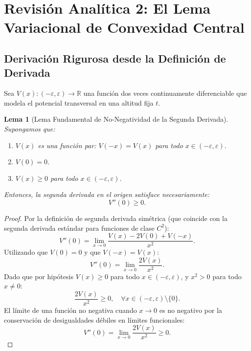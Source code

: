 \documentclass[11pt,a4paper]{article}
\newtheorem{lemma}[theorem]{Lema}
\theoremstyle{definition}
\theoremstyle{remark}
\begin{document}
\section{Revisión Analítica 2: El Lema Variacional de Convexidad Central}

\subsection{Derivación Rigurosa desde la Definición de Derivada}

Sea $V(x) \colon (-\varepsilon, \varepsilon) \to \mathbb{R}$ una función dos veces continuamente diferenciable que modela el potencial transversal en una altitud fija $t$.

\begin{lemma}[Lema Fundamental de No-Negatividad de la Segunda Derivada]
Supongamos que:
\begin{enumerate}
    \item $V(x)$ es una función par: $V(-x) = V(x)$ para todo $x \in (-\varepsilon, \varepsilon)$.
    \item $V(0) = 0$.
    \item $V(x) \ge 0$ para todo $x \in (-\varepsilon, \varepsilon)$.
\end{enumerate}
Entonces, la segunda derivada en el origen satisface necesariamente:
\begin{equation}
V''(0) \ge 0.
\end{equation}
\end{lemma}

\begin{proof}
Por la definición de segunda derivada simétrica (que coincide con la segunda derivada estándar para funciones de clase $C^2$):
\begin{equation}
V''(0) = \lim_{x \to 0} \frac{V(x) - 2V(0) + V(-x)}{x^2}.
\end{equation}
Utilizando que $V(0) = 0$ y que $V(-x) = V(x)$:
\begin{equation}
V''(0) = \lim_{x \to 0} \frac{2V(x)}{x^2}.
\end{equation}
Dado que por hipótesis $V(x) \ge 0$ para todo $x \in (-\varepsilon, \varepsilon)$, y $x^2 > 0$ para todo $x \neq 0$:
\begin{equation}
\frac{2V(x)}{x^2} \ge 0, \quad \forall x \in (-\varepsilon, \varepsilon) \setminus \{0\}.
\end{equation}
El límite de una función no negativa cuando $x \to 0$ es no negativo por la conservación de desigualdades débiles en límites funcionales:
\begin{equation}
V''(0) = \lim_{x \to 0} \frac{2V(x)}{x^2} \ge 0.
\end{equation}
\end{proof}
\end{document}
